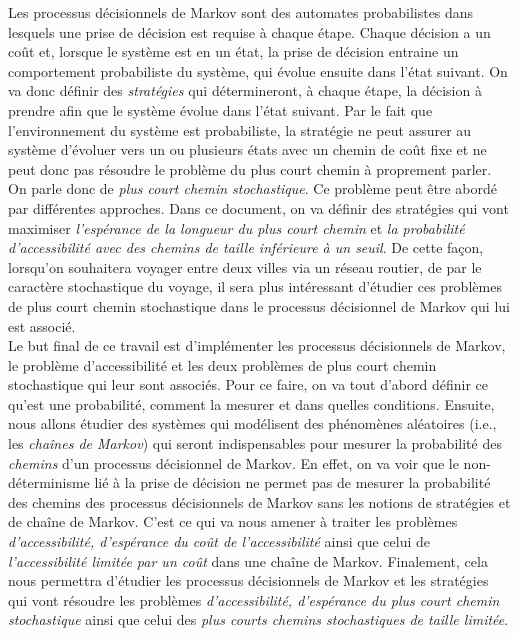 \documentclass[12pt,a4paper]{report}
\theoremstyle{definition}%
\theoremstyle{remark}
\begin{document}
Les processus décisionnels de Markov sont des automates probabilistes dans
lesquels une prise de décision est requise à chaque étape. Chaque décision a un
coût et, lorsque le système est en un état, la prise de décision
entraine un comportement probabiliste du système, qui
évolue ensuite dans l'état suivant.
On va donc définir des \textit{stratégies}
qui détermineront, à chaque étape, la décision à prendre afin que le système évolue dans l'état suivant. Par le fait que l'environnement du système est probabiliste, la stratégie ne peut assurer au système d'évoluer vers un ou plusieurs états avec un chemin de coût fixe et ne peut donc pas résoudre le problème du plus court chemin à proprement parler. On parle donc de \textit{plus
court chemin stochastique}. Ce problème peut être abordé par différentes
approches. Dans ce document, on va définir des stratégies qui vont maximiser
\textit{l'espérance de la longueur du plus court chemin} et \textit{la probabilité d'accessibilité avec des chemins de taille inférieure à un seuil}.
De cette façon, lorsqu'on souhaitera voyager entre deux villes via un réseau
routier, de par le caractère stochastique du voyage, il sera plus intéressant
d'étudier ces problèmes de plus court chemin stochastique dans le processus
décisionnel de Markov qui lui est associé. \\

Le but final de ce travail est d'implémenter les processus décisionnels de Markov, le problème d'accessibilité et
les deux problèmes de plus court chemin stochastique qui leur sont associés.
Pour ce faire, on va tout d'abord définir ce qu'est une
probabilité, comment la mesurer et dans quelles conditions. Ensuite, nous allons étudier
des systèmes qui modélisent des phénomènes aléatoires (i.e., les \textit{chaînes de Markov}) qui seront indispensables
pour mesurer la probabilité des \textit{chemins} d'un processus décisionnel de Markov.
En effet, on va voir que le non-déterminisme lié à la prise de décision
ne permet pas de mesurer la probabilité des chemins des processus
décisionnels de Markov sans les notions de stratégies et de chaîne de Markov.
C'est ce qui va nous amener à traiter les problèmes \textit{d'accessibilité, d'espérance du coût de l'accessibilité} ainsi que celui de \textit{l'accessibilité limitée par un coût}
dans une chaîne de Markov.
Finalement, cela nous permettra d'étudier les processus décisionnels de Markov
et les stratégies qui vont résoudre les problèmes \textit{d'accessibilité,
d'espérance du plus court chemin stochastique} ainsi que celui des \textit{plus courts
chemins stochastiques de taille limitée}.
\end{document}
